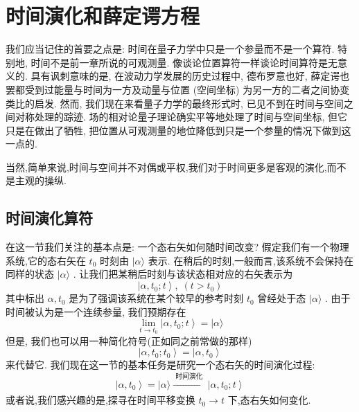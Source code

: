 \documentclass[lang=cn,newtx,10pt,scheme=chinese,thmcnt=section]{elegantbook}
\begin{document}
\section{时间演化和薛定谔方程}
我们应当记住的首要之点是: 时间在量子力学中只是一个参量而不是一个算符. 特别地, 时间不是前一章所说的可观测量. 像谈论位置算符一样谈论时间算符是无意义的. 具有讽刺意味的是, 在波动力学发展的历史过程中, 德布罗意也好, 薛定谔也罢都受到过能量与时间为一方及动量与位置 (空间坐标) 为另一方的二者之间协变类比的启发. 然而, 我们现在来看量子力学的最终形式时, 已见不到在时间与空间之间对称处理的踪迹. 场的相对论量子理论确实平等地处理了时间与空间坐标, 但它只是在做出了牺牲, 把位置从可观测量的地位降低到只是一个参量的情况下做到这一点的.

当然,简单来说,时间与空间并不对偶或平权,我们对于时间更多是客观的演化,而不是主观的操纵.
\subsection*{时间演化算符}
在这一节我们关注的基本点是: 一个态右矢如何随时间改变? 假定我们有一个物理系统,它的态右矢在 ${t}_{0}$ 时刻由 $|\alpha \rangle$ 表示. 在稍后的时刻,一般而言,该系统不会保持在同样的状态 $|\alpha \rangle$ . 让我们把某稍后时刻与该状态相对应的右矢表示为
\begin{equation}
	\left| {\alpha ,{t}_{0};t}\right\rangle ,\;\left( {t > {t}_{0}}\right)
\end{equation}
其中标出 $\alpha ,{t}_{0}$ 是为了强调该系统在某个较早的参考时刻 ${t}_{0}$ 曾经处于态 $|\alpha \rangle$ . 由于时间被认为是一个连续参量, 我们预期存在
\begin{equation}
	\mathop{\lim }\limits_{{t \rightarrow {t}_{0}}}\left| {\alpha ,{t}_{0};t}\right\rangle = |\alpha \rangle
\end{equation}
但是, 我们也可以用一种简化符号(正如同之前常做的那样)
\begin{equation}
	\left| {\alpha ,{t}_{0};{t}_{0}}\right\rangle = \left| {\alpha ,{t}_{0}}\right\rangle
\end{equation}
来代替它. 我们现在这一节的基本任务是研究一个态右矢的时间演化过程:
\begin{equation}
	\left| {\alpha ,{t}_{0}}\right\rangle = |\alpha \rangle \xrightarrow[]{\text{ 时间演化 }}\left| {\alpha ,{t}_{0};t}\right\rangle
\end{equation}
或者说,我们感兴趣的是,探寻在时间平移变换 ${t}_{0} \rightarrow t$ 下,态右矢如何变化.
\end{document}
